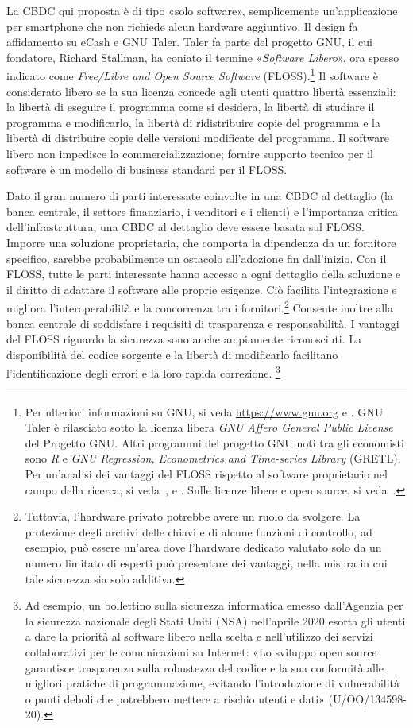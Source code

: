 \documentclass{article}
\begin{document}
La CBDC qui proposta è di tipo «solo software», semplicemente 
un'applicazione per smartphone che non richiede alcun hardware aggiuntivo. 
Il design fa affidamento su eCash e GNU Taler. Taler fa parte del progetto 
GNU, il cui fondatore, Richard Stallman, ha coniato il termine 
«\emph{Software Libero}», ora spesso indicato come \textit{Free/Libre 
and Open Source Software} (FLOSS).\footnote{Per ulteriori informazioni 
su GNU, si veda \url{https://www.gnu.org} e \cite{Stallman}. GNU Taler 
è rilasciato sotto la licenza libera \textit{GNU Affero General Public 
License} del Progetto GNU. Altri programmi del progetto GNU noti tra gli 
economisti sono \textit{R} e \textit{GNU Regression, Econometrics and 
Time-series Library} (GRETL). Per un'analisi dei vantaggi del FLOSS 
rispetto al software proprietario nel campo della ricerca, si veda~\cite{Baiocchi}, \cite{Yalta2008} e \cite{Yalta2010}. 
Sulle licenze libere e open source, si veda~\cite{Lerner}.} Il software 
è considerato libero se la sua licenza concede agli utenti quattro libertà 
essenziali: la libertà di eseguire il programma come si desidera, la 
libertà di studiare il programma e modificarlo, la libertà di ridistribuire 
copie del programma e la libertà di distribuire copie delle versioni 
modificate del programma. Il software libero non impedisce la 
commercializzazione; fornire supporto tecnico per il software è un modello 
di business standard per il FLOSS.

Dato il gran numero di parti interessate coinvolte in una CBDC al 
dettaglio (la banca centrale, il settore finanziario, i venditori e 
i clienti) e l'importanza critica dell'infrastruttura, una CBDC al 
dettaglio deve essere basata sul FLOSS. Imporre una soluzione 
proprietaria, che comporta la dipendenza da un fornitore specifico, 
sarebbe probabilmente un ostacolo all'adozione fin dall'inizio. Con il 
FLOSS, tutte le parti interessate hanno accesso a ogni dettaglio della 
soluzione e il diritto di adattare il software alle proprie esigenze. 
Ciò facilita l'integrazione e migliora l'interoperabilità e la 
concorrenza tra i fornitori.\footnote{Tuttavia, l'hardware privato 
potrebbe avere un ruolo da svolgere. La protezione degli archivi delle 
chiavi e di alcune funzioni di controllo, ad esempio, può essere un'area 
dove l'hardware dedicato valutato solo da un numero limitato di esperti 
può presentare dei vantaggi, nella misura in cui tale sicurezza sia solo 
additiva.} Consente inoltre alla banca centrale di soddisfare i requisiti 
di trasparenza e responsabilità. I vantaggi del FLOSS riguardo la 
sicurezza sono anche ampiamente riconosciuti. La disponibilità del codice 
sorgente e la libertà di modificarlo facilitano l'identificazione degli 
errori e la loro rapida correzione. \footnote{Ad esempio, un bollettino 
sulla sicurezza informatica emesso dall'Agenzia per la sicurezza nazionale 
degli Stati Uniti (NSA) nell'aprile 2020 esorta gli utenti a dare la 
priorità al software libero nella scelta e nell'utilizzo dei servizi 
collaborativi per le comunicazioni su Internet: «Lo sviluppo open source 
garantisce trasparenza sulla robustezza del codice e la sua conformità 
alle migliori pratiche di programmazione, evitando l'introduzione di 
vulnerabilità o punti deboli che potrebbero mettere a rischio utenti e 
dati» (U/OO/134598-20).}
\end{document}
